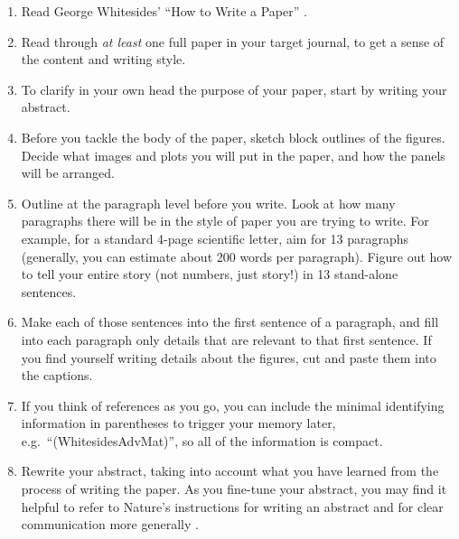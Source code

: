 \begin{enumerate}
\item Read George Whitesides' ``How to Write a Paper'' \cite{WhitesidesAdvMat2004}.

\item Read through \emph{at least} one full paper in your target journal, to get a sense of the content and writing style.

\item To clarify in your own head the purpose of your paper, start by writing your abstract.

\item Before you tackle the body of the paper, sketch block outlines of the figures. Decide what images and plots you will put in the paper, and how the panels will be arranged.

\item Outline at the paragraph level before you write. Look at how many paragraphs there will be in the style of paper you are trying to write. For example, for a standard 4-page scientific letter, aim for 13 paragraphs (generally, you can estimate about 200 words per paragraph). Figure out how to tell your entire story (not numbers, just story!) in 13 stand-alone sentences.

\item Make each of those sentences into the first sentence of a paragraph, and fill into each paragraph only details that are relevant to that first sentence. If you find yourself writing details about the figures, cut and paste them into the captions.

\item If you think of references as you go, you can include the minimal identifying information in parentheses to trigger your memory later, e.g.\ ``(WhitesidesAdvMat)'', so all of the information is compact.

\item Rewrite your abstract, taking into account what you have learned from the process of writing the paper. As you fine-tune your abstract, you may find it helpful to refer to Nature's instructions for writing an abstract \cite{NatureAbstract} and for clear communication more generally \cite{NatNeuro2000}.
\end{enumerate}
\vspace{2mm}

